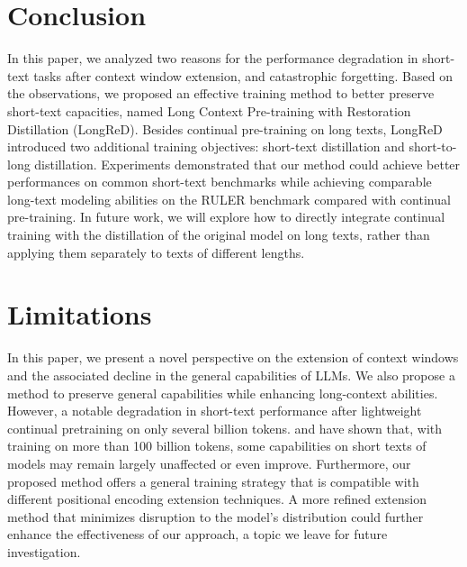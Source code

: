 \section{Conclusion}
\label{sec:conclusion}

In this paper, we analyzed two reasons for the performance degradation in short-text tasks after context window extension,   and {catastrophic forgetting}. Based on the observations, we proposed an effective training method to better preserve short-text capacities, named {Long} Context Pre-training with {Re}storation {D}istillation ({LongReD}). Besides continual pre-training on long texts, LongReD introduced two additional training objectives: short-text distillation and short-to-long distillation. Experiments demonstrated that our method could achieve better performances on common short-text benchmarks while achieving comparable long-text modeling abilities on the RULER benchmark compared with continual pre-training. In future work, we will explore how to directly integrate continual training with the distillation of the original model on long texts, rather than applying them separately to texts of different lengths.


\section*{Limitations}
\label{sec:limitation}

In this paper, we present a novel perspective on the extension of context windows and the associated decline in the general capabilities of LLMs. We also propose a method to preserve general capabilities while enhancing long-context abilities. However, a notable degradation in short-text performance after lightweight continual pretraining on only several billion tokens. \citet{xiong-naacl-2024-effective} and \citet{Dubey-arxiv-2023-llama3} have shown that, with training on more than 100 billion tokens, some capabilities on short texts of models may remain largely unaffected or even improve. Furthermore, our proposed method offers a general training strategy that is compatible with different positional encoding extension techniques. A more refined extension method that minimizes disruption to the model's distribution could further enhance the effectiveness of our approach, a topic we leave for future investigation.

